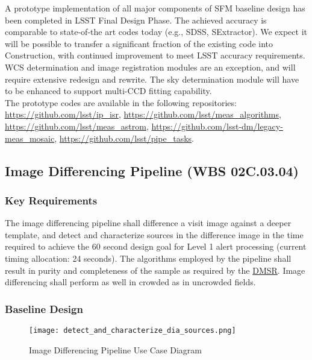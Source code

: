 \documentclass[12pt]{article}
\newcommand{\ds}[2]{{\color{blue} \href{https://docushare.lsstcorp.org/docushare/dsweb/Get/#1}{#2}}\xspace}
\newcommand{\DMSR}{\ds{LSE-61}{DMSR}}
\newcommand{\wbsDiffim}{WBS 02C.03.04}
\begin{document}
A prototype implementation of all major components of SFM baseline design has been completed in LSST Final Design Phase. The achieved accuracy is comparable to state-of-the art codes today (e.g., SDSS, SExtractor). We expect it will be possible to transfer a significant fraction of the existing code into Construction, with continued improvement to meet LSST accuracy requirements.
\\

WCS determination and image registration modules are an exception, and will require extensive redesign and rewrite. The sky determination module will have to be enhanced to support multi-CCD fitting capability.
\\

The prototype codes are available in the following repositories: \url{https://github.com/lsst/ip_isr}, \url{https://github.com/lsst/meas_algorithms}, \url{https://github.com/lsst/meas_astrom}, \url{https://github.com/lsst-dm/legacy-meas_mosaic}, \url{https://github.com/lsst/pipe_tasks}.

\clearpage

\subsection{Image Differencing Pipeline (\wbsDiffim)}

\subsubsection{Key Requirements}

The image differencing pipeline shall difference a visit image against a deeper template, and detect and characterize sources in the difference image in the time required to achieve the 60 second design goal for Level 1 alert processing (current timing allocation: 24 seconds). The algorithms employed by the pipeline shall result in purity and completeness of the sample as required by the \DMSR\@. Image differencing shall perform as well in crowded as in uncrowded fields.

\subsubsection{Baseline Design}
\label{sec:diffimDesign}

\begin{figure}
\texttt{[image: detect\_and\_characterize\_dia\_sources.png]}
\caption{Image Differencing Pipeline Use Case Diagram\label{fig:diffimUML}}
\end{figure}
\end{document}
